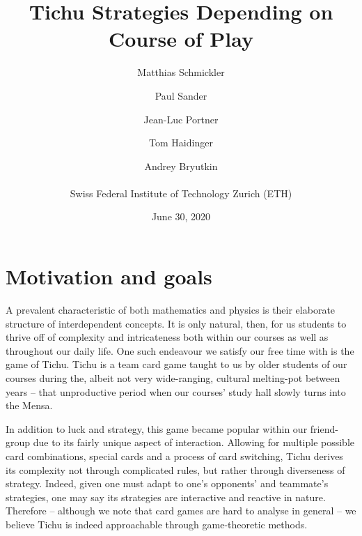 


\usepackage{multirow}
\usepackage{listings}
\usepackage{commath}
\usepackage{subcaption}
\usepackage{stfloats}
\usepackage{hyperref}
\makeatletter
\renewcommand\paragraph{\@startsection{paragraph}{4}{\z@}%
                                    {3pt  \@plus 1pt \@minus 1pt}%
                                    {-1em}%
                                    {\normalfont\normalsize\bfseries}}

\makeatother



\title{\textbf{Tichu Strategies Depending on Course of Play}}
\date{June 30, 2020}
\author{Matthias Schmickler \and Paul Sander \and Jean-Luc Portner \and Tom Haidinger \and Andrey Bryutkin \\ \\ Swiss Federal Institute of Technology Zurich (ETH)}
\maketitle

\section*{Motivation and goals}

A prevalent characteristic of both mathematics and physics is their elaborate structure of interdependent concepts. It is only natural, then, for us students to thrive off of complexity and intricateness both within our courses as well as throughout our daily life. One such endeavour we satisfy our free time with is the game of Tichu. Tichu is a team card game taught to us by older students of our courses during the, albeit not very wide-ranging, cultural melting-pot between years – that unproductive period when our courses’ study hall slowly turns into the Mensa. 

    In addition to luck and strategy, this game became popular within our friend-group due to its fairly unique aspect of interaction. Allowing for multiple possible card combinations, special cards and a process of card switching, Tichu derives its complexity not through complicated rules, but rather through diverseness of strategy. Indeed, given one must adapt to one’s opponents’ and teammate’s strategies, one may say its strategies are interactive and reactive in nature. Therefore – although we note that card games are hard to analyse in general – we believe Tichu is indeed approachable through game-theoretic methods. 

